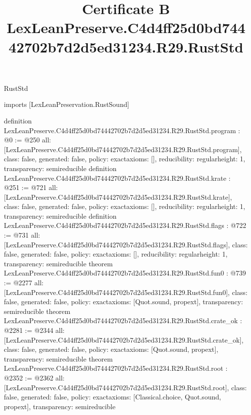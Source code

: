 \begin{lexlean}{RustStd}
\title{Certificate B LexLeanPreserve.C4d4ff25d0bd74442702b7d2d5ed31234.R29.RustStd}
\begin{coremodule}
imports [LexLeanPreservation.RustSound]

definition LexLeanPreserve.C4d4ff25d0bd74442702b7d2d5ed31234.R29.RustStd.program : @0 := @250 {
  all: [LexLeanPreserve.C4d4ff25d0bd74442702b7d2d5ed31234.R29.RustStd.program],
  class: false,
  generated: false,
  policy: exact{axioms: []},
  reducibility: regular{height: 1},
  transparency: semireducible
}
definition LexLeanPreserve.C4d4ff25d0bd74442702b7d2d5ed31234.R29.RustStd.krate : @251 := @721 {
  all: [LexLeanPreserve.C4d4ff25d0bd74442702b7d2d5ed31234.R29.RustStd.krate],
  class: false,
  generated: false,
  policy: exact{axioms: []},
  reducibility: regular{height: 1},
  transparency: semireducible
}
definition LexLeanPreserve.C4d4ff25d0bd74442702b7d2d5ed31234.R29.RustStd.flags : @722 := @731 {
  all: [LexLeanPreserve.C4d4ff25d0bd74442702b7d2d5ed31234.R29.RustStd.flags],
  class: false,
  generated: false,
  policy: exact{axioms: []},
  reducibility: regular{height: 1},
  transparency: semireducible
}
theorem LexLeanPreserve.C4d4ff25d0bd74442702b7d2d5ed31234.R29.RustStd.fun0 : @739 := @2277 {
  all: [LexLeanPreserve.C4d4ff25d0bd74442702b7d2d5ed31234.R29.RustStd.fun0],
  class: false,
  generated: false,
  policy: exact{axioms: [Quot.sound, propext]},
  transparency: semireducible
}
theorem LexLeanPreserve.C4d4ff25d0bd74442702b7d2d5ed31234.R29.RustStd.crate_ok : @2281 := @2344 {
  all: [LexLeanPreserve.C4d4ff25d0bd74442702b7d2d5ed31234.R29.RustStd.crate_ok],
  class: false,
  generated: false,
  policy: exact{axioms: [Quot.sound, propext]},
  transparency: semireducible
}
theorem LexLeanPreserve.C4d4ff25d0bd74442702b7d2d5ed31234.R29.RustStd.root : @2352 := @2362 {
  all: [LexLeanPreserve.C4d4ff25d0bd74442702b7d2d5ed31234.R29.RustStd.root],
  class: false,
  generated: false,
  policy: exact{axioms: [Classical.choice, Quot.sound, propext]},
  transparency: semireducible
}


\end{coremodule}
\end{lexlean}
